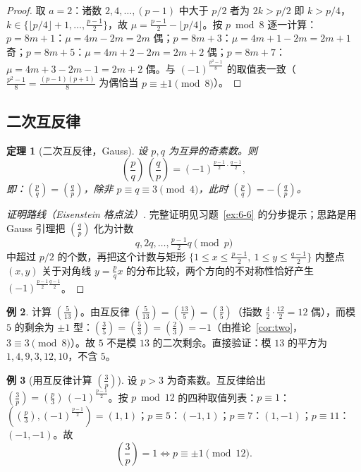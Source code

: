 \documentclass[a4paper,11pt]{ctexart}
\numberwithin{equation}{section}
\theoremstyle{plain}
\newtheorem{theorem}{定理}[section]
\theoremstyle{definition}
\newtheorem{example}[theorem]{例}
\theoremstyle{remark}
\newcommand{\leg}[2]{\left(\frac{#1}{#2}\right)}
\begin{document}
\begin{proof}
取 $a=2$：诸数 $2,4,\dots,(p-1)$ 中大于 $p/2$ 者为 $2k>p/2$ 即 $k>p/4$，$k\in\{\lfloor p/4\rfloor+1,\dots,\frac{p-1}2\}$，故 $\mu=\frac{p-1}2-\lfloor p/4\rfloor$。按 $p\bmod 8$ 逐一计算：$p=8m+1$：$\mu=4m-2m=2m$ 偶；$p=8m+3$：$\mu=4m+1-2m=2m+1$ 奇；$p=8m+5$：$\mu=4m+2-2m=2m+2$ 偶；$p=8m+7$：$\mu=4m+3-2m-1=2m+2$ 偶。与 $(-1)^{\frac{p^2-1}{8}}$ 的取值表一致（$\frac{p^2-1}{8}=\frac{(p-1)(p+1)}8$ 为偶恰当 $p\equiv\pm1\pmod8$）。
\end{proof}

\subsection{二次互反律}

\begin{theorem}[二次互反律，Gauss]\label{thm:QR}
设 $p,q$ 为互异的奇素数。则
\[
\leg{p}{q}\,\leg{q}{p}=(-1)^{\frac{p-1}{2}\cdot\frac{q-1}{2}},
\]
即：$\leg{p}{q}=\leg{q}{p}$，除非 $p\equiv q\equiv3\pmod 4$，此时 $\leg{p}{q}=-\leg{q}{p}$。
\end{theorem}

\begin{proof}[证明路线（Eisenstein 格点法）]
完整证明见习题~\ref{ex:6-6} 的分步提示；思路是用 Gauss 引理把 $\leg{q}{p}$ 化为计数
\[
q,2q,\dots,\tfrac{p-1}2 q \pmod p
\]
中超过 $p/2$ 的个数，再把这个计数与矩形 $\{1\le x\le \frac{p-1}2,\ 1\le y\le\frac{q-1}2\}$ 内整点 $(x,y)$ 关于对角线 $y=\frac pq x$ 的分布比较，两个方向的不对称性恰好产生 $(-1)^{\frac{p-1}{2}\frac{q-1}{2}}$。
\end{proof}

\begin{example}
计算 $\leg{5}{13}$。由互反律 $\leg{5}{13}=\leg{13}{5}=\leg{3}{5}$（指数 $\frac42\cdot\frac{12}2=12$ 偶），而模 $5$ 的剩余为 $\pm1$ 型：$\leg{3}{5}=\leg{5}{3}=\leg{2}{3}=-1$（由推论~\ref{cor:two}，$3\equiv3\pmod8$）。故 $5$ 不是模 $13$ 的二次剩余。直接验证：模 $13$ 的平方为 $1,4,9,3,12,10$，不含 $5$。
\end{example}

\begin{example}[用互反律计算 $\leg{3}{p}$]\label{ex:3leg}
设 $p>3$ 为奇素数。互反律给出 $\leg{3}{p}=\leg{p}{3}\,(-1)^{\frac{p-1}{2}}$。按 $p\bmod 12$ 的四种取值列表：$p\equiv1$：$(\leg{p}{3},(-1)^{\frac{p-1}2})=(1,1)$；$p\equiv5$：$(-1,1)$；$p\equiv7$：$(1,-1)$；$p\equiv11$：$(-1,-1)$。故
\[
\leg{3}{p}=1\iff p\equiv\pm1\pmod{12}.
\]
\end{example}
\end{document}
